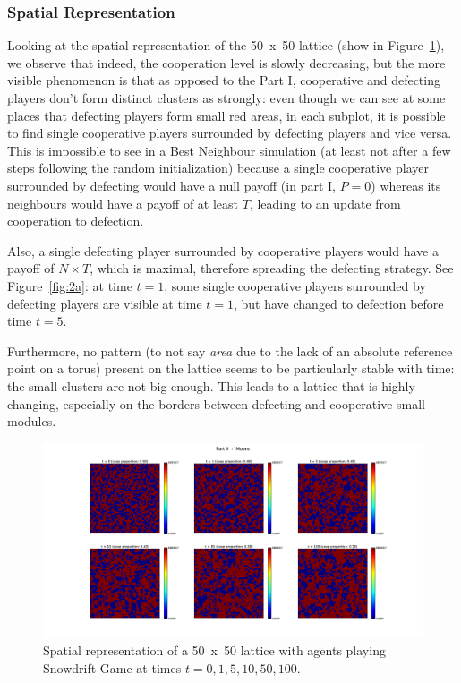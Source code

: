 \documentclass{article}
\begin{document}
\subsubsection{Spatial Representation}

Looking at the spatial representation of the 50~x~50 lattice (show in Figure~\ref{fig:Spatial representation II.1}),
we observe that indeed, the cooperation level is slowly decreasing, but the more visible phenomenon is that
as opposed to the Part I, cooperative and defecting players don't form distinct clusters as strongly: even
though we can see at some places that defecting players form small red areas, in each subplot, it is
possible to find single cooperative players surrounded by defecting players and vice versa. This is
impossible to see in a Best Neighbour simulation (at least not after a few steps following the random
initialization) because a single cooperative player surrounded by defecting would have a null payoff
(in part I, $P=0$) whereas its neighbours would have a payoff of at least $T$, leading to an update from
cooperation to defection.

Also, a single defecting player surrounded by cooperative players would have a payoff of $N \times T$, which
is maximal, therefore spreading the defecting strategy. See Figure~\ref{fig:2a}: at time $t=1$, some
single cooperative players surrounded by defecting players are visible at time $t=1$, but have changed to
defection before time $t=5$.

Furthermore, no pattern (to not say \textit{area} due to the lack of an absolute reference point on a torus)
present on the lattice seems to be particularly stable with time: the small clusters are not big enough.
This leads to a lattice that is highly changing, especially on the borders between defecting and cooperative
small modules.

\begin{figure}[!t]
\hspace{-1.8cm}
\includegraphics[width=1.2\textwidth]{imgs/part2_Moore_periods.png}
\caption{Spatial representation of a 50~x~50 lattice with agents playing Snowdrift Game at times $t=0,1,5,10,50,100$.
\label{fig:Spatial representation II.1}}
\end{figure}
\end{document}
